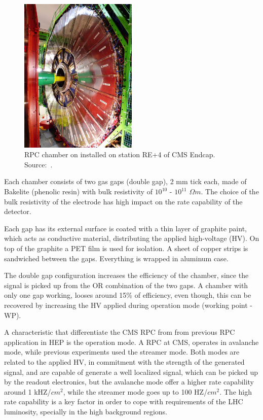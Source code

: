 \begin{figure}[h]
    \begin{center}
    \includegraphics[width=0.5\textwidth,keepaspectratio]{figures/rpc/picture_rpc.jpg}
    \end{center}
    \caption{RPC chamber on installed on station RE+4 of CMS Endcap. Source:~\cite{rpc_picture}.}
    \label{picture_rpc}
\end{figure}


Each chamber consists of two gas gaps (double gap), 2 mm tick each, made of Bakelite (phenolic resin) with bulk resistivity of $10^{10}$ - $10^{11}$ $\Omega m$. The choice of the bulk resistivity of the electrode has high impact on the rate capability of the detector.

Each gap has its external surface is coated with a thin layer of graphite paint, which acts as conductive material, distributing the applied high-voltage (HV). On top of the graphite a PET film is used for isolation. A sheet of copper strips is sandwiched between the gaps. Everything is wrapped in aluminum case.

The double gap configuration increases the efficiency of the chamber, since the signal is picked up from the OR combination of the two gaps. A chamber with only one gap working, looses around 15\% of efficiency, even though, this can be recovered by increasing the HV applied during operation mode (working point - WP).

A characteristic that differentiate the CMS RPC  from from previous RPC application in HEP is the operation mode. A RPC at CMS, operates in avalanche mode, while previous experiments used the streamer mode. Both modes are related to the applied HV, in commitment with the strength of the generated signal, and are capable of generate a well localized signal, which can be picked up by the readout electronics, but the avalanche mode offer a higher rate capability around 1 kHZ/$cm^2$, while the streamer mode goes up to 100 HZ/$cm^2$. The high rate capability is a key factor in order to cope with requirements of the LHC luminosity, specially in the high background regions.

